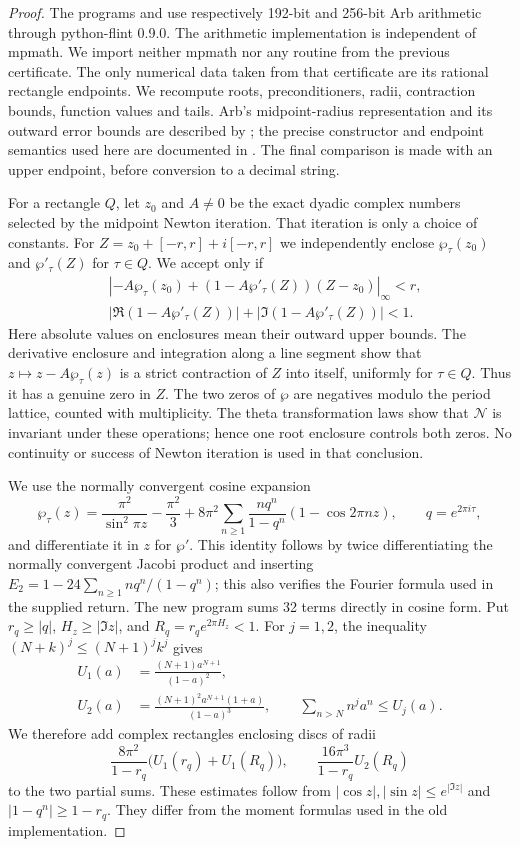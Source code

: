 \begin{proof}
The programs  and
 use respectively 192-bit and 256-bit
Arb arithmetic through python-flint 0.9.0. The arithmetic implementation
is independent of mpmath. We import neither mpmath nor any routine
from the previous certificate. The only numerical data taken from that
certificate are its rational rectangle endpoints. We recompute roots,
preconditioners, radii, contraction bounds, function values and tails.
Arb's midpoint-radius representation and its outward error bounds are
described by \citet[Sections 2--3]{Johansson2016}; the precise
constructor and endpoint semantics used here are documented in
\citet{PythonFlint2026}. The final comparison is made with an upper
endpoint, before conversion to a decimal string.

For a rectangle $Q$, let $z_0$ and $A\ne0$ be the exact dyadic complex
numbers selected by the midpoint Newton iteration. That iteration is
only a choice of constants. For $Z=z_0+[-r,r]+i[-r,r]$ we independently
enclose $\wp_\tau(z_0)$ and $\wp'_\tau(Z)$ for $\tau\in Q$.
We accept only if
\[
 \begin{split}
 &\left|-A\wp_\tau(z_0)
 +(1-A\wp'_\tau(Z))(Z-z_0)\right|_\infty<r,\\
 &|\Re(1-A\wp'_\tau(Z))|
       +|\Im(1-A\wp'_\tau(Z))|<1.
 \end{split}
\]
Here absolute values on enclosures mean their outward upper bounds.
The derivative enclosure and integration along a line segment show
that $z\mapsto z-A\wp_\tau(z)$ is a strict contraction of $Z$ into
itself, uniformly for $\tau\in Q$. Thus it has a genuine zero in $Z$.
The two zeros of $\wp$ are negatives modulo the period lattice, counted
with multiplicity. The theta transformation laws show that
$\mathcal N$ is invariant under these operations; hence one root
enclosure controls both zeros. No continuity or success of Newton
iteration is used in that conclusion.

We use the normally convergent cosine expansion
\[
 \wp_\tau(z)=\frac{\pi^2}{\sin^2\pi z}-\frac{\pi^2}{3}
 +8\pi^2\sum_{n\geq1}\frac{nq^n}{1-q^n}
                      (1-\cos 2\pi nz),\qquad q=e^{2\pi i\tau},
\]
and differentiate it in $z$ for $\wp'$. This identity follows by twice
differentiating the normally convergent Jacobi product and inserting
$E_2=1-24\sum_{n\geq1}nq^n/(1-q^n)$; this also verifies the
Fourier formula used in the supplied return. The new program sums
32 terms directly in cosine form. Put $r_q\geq|q|$,
$H_z\geq|\Im z|$, and $R_q=r_q e^{2\pi H_z}<1$.
For $j=1,2$, the inequality $(N+k)^j\leq(N+1)^jk^j$ gives
\[
 \begin{aligned}
 U_1(a)&=\frac{(N+1)a^{N+1}}{(1-a)^2},\\
 U_2(a)&=\frac{(N+1)^2a^{N+1}(1+a)}{(1-a)^3},
 \qquad
 \sum_{n>N}n^j a^n\leq U_j(a).
 \end{aligned}
\]
We therefore add complex rectangles enclosing discs of radii
\[
 \frac{8\pi^2}{1-r_q}\bigl(U_1(r_q)+U_1(R_q)\bigr),
 \qquad \frac{16\pi^3}{1-r_q}U_2(R_q)
\]
to the two partial sums. These estimates follow from
$|\cos z|,|\sin z|\leq e^{|\Im z|}$ and
$|1-q^n|\geq1-r_q$. They differ from the moment formulas used in
the old implementation.


\end{proof}
